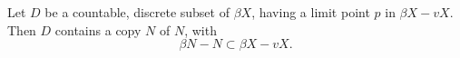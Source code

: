 Let $D$ be a countable, discrete subset of $\beta X$, having a limit point $p$ in $\beta X - vX$. Then $D$ contains a copy $N$ of $N$, with
$$\beta N - N \subset \beta X - vX.$$
